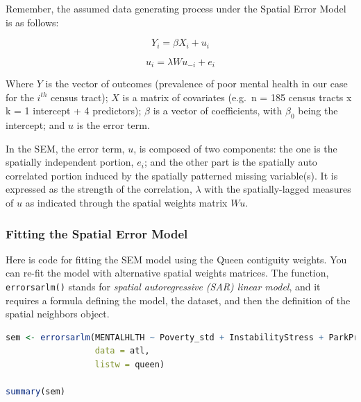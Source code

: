 \documentclass[
]{book}
\newcommand{\passthrough}[1]{#1}
\begin{document}
Remember, the assumed data generating process under the Spatial Error Model is as follows:

\[Y_i=\beta X_i+u_i\]

\[u_i=\lambda Wu_{-i}+e_i\]

Where \(Y\) is the vector of outcomes (prevalence of poor mental health in our case for the \(i^{th}\) census tract); \(X\) is a matrix of covariates (e.g.~n = 185 census tracts x k = 1 intercept + 4 predictors); \(\beta\) is a vector of coefficients, with \(\beta_0\) being the intercept; and \(u\) is the error term.

In the SEM, the error term, \(u\), is composed of two components: the one is the spatially independent portion, \(e_i\); and the other part is the spatially auto correlated portion induced by the spatially patterned missing variable(s). It is expressed as the strength of the correlation, \(\lambda\) with the spatially-lagged measures of \(u\) as indicated through the spatial weights matrix \(Wu\).

\hypertarget{fitting-the-spatial-error-model}{%
\subsubsection{Fitting the Spatial Error Model}\label{fitting-the-spatial-error-model}}

Here is code for fitting the SEM model using the Queen contiguity weights. You can re-fit the model with alternative spatial weights matrices. The function, \passthrough{\lstinline!errorsarlm()!} stands for \emph{spatial autoregressive (SAR) linear model}, and it requires a formula defining the model, the dataset, and then the definition of the spatial neighbors object.

\begin{lstlisting}[language=R]
sem <- errorsarlm(MENTALHLTH ~ Poverty_std + InstabilityStress + ParkProximity_std  + PHYSHLTH,
                  data = atl,
                  listw = queen)

summary(sem)
\end{lstlisting}
\end{document}
